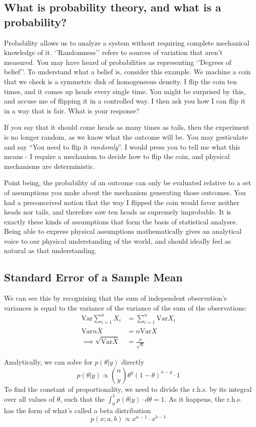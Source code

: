 \documentclass[11pt,a4paper,article]{memoir} %
\begin{document}
\subsection{What is probability theory, and what is a probability?}
Probability allows us to analyze a system without requiring complete mechanical knowledge of it. `'Randomness'' refers to sources of variation that aren't measured. You may have heard of probabilities as representing `'Degrees of belief''. To understand what a belief is, consider this example. We machine a coin that we check is a symmetric disk of homogeneous density. I flip the coin ten times, and it comes up heads every single time. You might be surprised by this, and accuse me of flipping it in a controlled way. I then ask you how I can flip it in a way that is fair. What is your response?
\par
If you say that it should come heads as many times as tails, then the experiment is no longer random, as we know what the outcome will be. You may gesticulate and say ``You need to flip it \emph{randomly}''. I would press you to tell me what this means - I require a mechanism to decide how to flip the coin, and physical mechanisms are deterministic.
\par
Point being, the probability of an outcome can only be evaluated relative to a set of assumptions you make about the mechanism generating those outcomes. You had a preconceived notion that the way I flipped the coin would favor neither heads nor tails, and therefore saw ten heads as supremely improbable. It is exactly these kinds of assumptions that form the basis of statistical analyses. Being able to express physical assumptions mathematically gives an analytical voice to our physical understanding of the world, and should ideally feel as natural as that understanding.
\newpage

\subsection{Standard Error of a Sample Mean}
We can see this by recognizing that the sum of independent observation's variances is equal to the variance of the variance of the sum of the observations:
\begin{align}
 \text{Var}\sum_{i = 1}^n X_i &= \sum_{i = 1}^n \text{Var}X_i\\
	\text{Var}n\bar{X} &= n\text{Var}X \\
	\implies \sqrt{\text{Var}\bar{X}} &= \frac{\sigma}{\sqrt{n}}
\end{align}
\par
Analytically, we can solve for $p(\theta|y)$ directly
\[
  p(\theta|y) \propto \binom{n}{y}\theta^y (1 - \theta)^{n-y}\cdot 1
\]
To find the constant of proportionality, we need to divide the r.h.s. by its integral over all values of $\theta$, such that the $\int_0^1 p(\theta|y)\cdot d\theta = 1$. As it happens, the r.h.s. has the form of what's called a beta distribution
\[
  p(x; a, b) \propto x^{a - 1}\cdot x^{b-1}
\]
\end{document}
